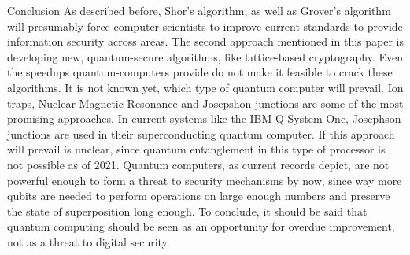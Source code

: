 \documentclass[aps,preprintnumbers,twocolumn]{revtex4}
\begin{document}
\begin{section}{Conclusion}
As described before, Shor's algorithm, 
as well as Grover's algorithm will presumably force computer scientists to improve current standards to provide information security across areas. 
The second approach mentioned in this paper is developing new, 
quantum-secure algorithms, 
like lattice-based cryptography. 
Even the speedups quantum-computers provide do not make it feasible to crack these algorithms. 
It is not known yet, which type of quantum computer will prevail. 
Ion traps, Nuclear Magnetic Resonance and Josepshon junctions are some of the most promising approaches. 
In current systems like the IBM Q System One, 
Josephson junctions are used in their superconducting quantum computer. 
If this approach will prevail is unclear, 
since quantum entanglement in this type of processor is not possible as of 2021. 
Quantum computers, 
as current records depict,  
are not powerful enough to form a threat to security mechanisms by now, 
since way more qubits are needed to perform operations on large enough numbers and preserve the state of superposition long enough. 
To conclude, it should be said that quantum computing should be seen as an opportunity for overdue improvement, not as a threat to digital security. 
\end{section}



\end{document}
